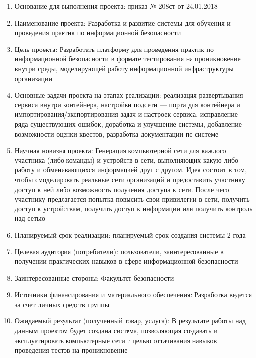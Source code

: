 \begin{enumerate}
\item Основание для выполнения проекта: приказ № 208ст от 24.01.2018\par
\item Наименование проекта: Разработка и развитие системы для обучения и проведения практик по информационной безопасности\par
\item Цель проекта: Разработать платформу для проведения практик по информационной безопасности в формате тестирования на проникновение внутри среды, моделирующей работу информационной инфраструктуры организации\par
\item Основные задачи проекта на этапах реализации: реализация развертывания сервиса внутри контейнера, настройки подсети — порта для контейнера и импортирования/экспортирования задач и настроек сервиса, исправление ряда существующих ошибок, доработка и улучшение системы, добавление возможности оценки квестов, разработка документации по системе\par
\item Научная новизна проекта: Генерация компьютерной сети для каждого участника (либо команды) и устройств в сети, выполняющих какую-либо работу и обменивающихся информацией друг с другом. Идея состоит в том, чтобы смоделировать реальные сети организаций и предоставить участнику доступ к ней либо возможность получения доступа к сети. После чего участнику предлагается попытка повысить свои привилегии в сети, получить доступ к устройствам, получить доступ к информации или получить контроль над сетью\par
\item Планируемый срок реализации: планируемый срок создания системы 2 года\par
\item Целевая аудитория (потребители): пользователи, заинтересованные в получении практических навыков в сфере информационной безопасности\par
\item Заинтересованные стороны:  Факультет безопасности\par
\item Источники финансирования и материального обеспечения: Разработка ведется за счет личных средств группы\par
\item Ожидаемый результат (полученный товар, услуга): В результате работы над данным проектом будет создана система, позволяющая создавать и эксплуатировать компьютерные сети с целью оттачивания навыков проведения тестов на проникновение\par

\end{enumerate}
